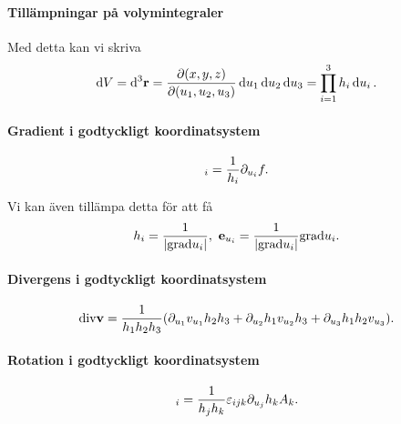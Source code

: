 \paragraph{Tillämpningar på volymintegraler}
Med detta kan vi skriva
\begin{align*}
	\dd{V} = \dd^3{\vb{r}} = \pdv{(x, y, z)}{(u_1, u_2, u_3)}\dd{u_1}\dd{u_2}\dd{u_3} = \prod\limits_{i = 1}^{3}h_{i}\dd{u_{i}}.
\end{align*}

\paragraph{Gradient i godtyckligt koordinatsystem}
\begin{align*}
	[\grad{f}]_i = \frac{1}{h_i}\del{u_i}{f}.
\end{align*}

Vi kan även tillämpa detta för att få
\begin{align*}
	h_i = \frac{1}{\abs{\text{grad}u_i}},\ \vb{e}_{u_i} = \frac{1}{\abs{\text{grad}u_i}}\text{grad}u_i.
\end{align*}

\paragraph{Divergens i godtyckligt koordinatsystem}
\begin{align*}
	\text{div}\vb{v} = \frac{1}{h_1h_2h_3}(\partial_{u_1}v_{u_1}h_2h_3 + \partial_{u_2}h_1v_{u_2}h_3 + \partial_{u_3}h_1h_2v_{u_3}).
\end{align*}

\paragraph{Rotation i godtyckligt koordinatsystem}
\begin{align*}
	[\curl{\vb{v}}]_i = \frac{1}{h_jh_k}\leci{ijk}\del{u_j}{h_kA_k}.
\end{align*}

